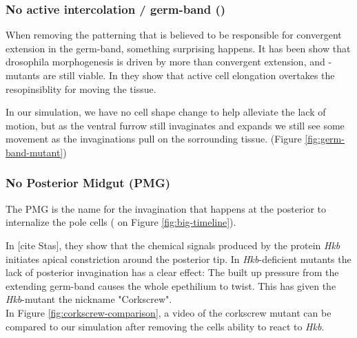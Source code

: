 
\subsubsection{No active intercolation / germ-band ()}
\label{sec:mutantNoGB}

When removing the patterning that is believed to be responsible for convergent extension in the germ-band, something surprising happens. It has been show that drosophila morphogenesis is driven by more than convergent extension, and -mutants are still viable. In  they show that active cell elongation overtakes the resopinsiblity for moving the tissue.

In our simulation, we have no cell shape change to help alleviate the lack of motion, but as the ventral furrow still invaginates and expands we still see some movement as the invaginations pull on the sorrounding tissue. (Figure \ref{fig:germ-band-mutant})



\subsubsection{No Posterior Midgut (PMG) }
The PMG is the name for the invagination that happens at the posterior to internalize the pole cells ( on Figure \ref{fig:big-timeline}).

In [cite Stas], they show that the chemical signals produced by the protein \textit{Hkb} initiates apical constriction around the posterior tip. In \textit{Hkb}-deficient mutants the lack of posterior invagination has a clear effect: The built up pressure from the extending germ-band causes the whole epethilium to twist. This has given the \textit{Hkb}-mutant the nickname "Corkscrew".\\

In Figure \ref{fig:corkscrew-comparison}, a video of the corkscrew mutant can be compared to our simulation after removing the cells ability to react to \textit{Hkb}.

